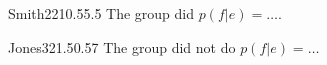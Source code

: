 
\begin{project1report}{Smith}{2}{2}{1}{0.5}{5.5}
The group did $p(f|e) = \ldots$.
\end{project1report}

\begin{project1report}{Jones}{3}{2}{1.5}{0.5}{7}
The group did not do $p(f|e) = \ldots$
\end{project1report}
